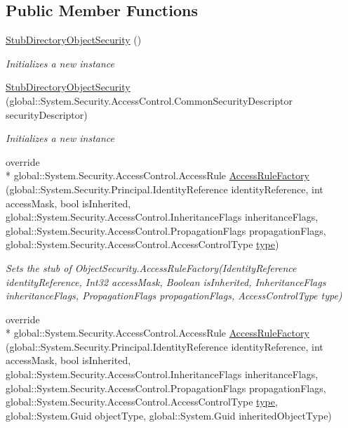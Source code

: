 \subsection*{Public Member Functions}
\begin{DoxyCompactItemize}
\item 
\hyperlink{class_system_1_1_security_1_1_access_control_1_1_fakes_1_1_stub_directory_object_security_ae020b64447dead50dcbdb99722ff2e1b}{Stub\-Directory\-Object\-Security} ()
\begin{DoxyCompactList}\small\item\em Initializes a new instance\end{DoxyCompactList}\item 
\hyperlink{class_system_1_1_security_1_1_access_control_1_1_fakes_1_1_stub_directory_object_security_a02e77e1d058c7b675a35b9373ad95db3}{Stub\-Directory\-Object\-Security} (global\-::\-System.\-Security.\-Access\-Control.\-Common\-Security\-Descriptor security\-Descriptor)
\begin{DoxyCompactList}\small\item\em Initializes a new instance\end{DoxyCompactList}\item 
override \\*
global\-::\-System.\-Security.\-Access\-Control.\-Access\-Rule \hyperlink{class_system_1_1_security_1_1_access_control_1_1_fakes_1_1_stub_directory_object_security_aeba7dc4f1c2937d47a41c2f3c3a7d830}{Access\-Rule\-Factory} (global\-::\-System.\-Security.\-Principal.\-Identity\-Reference identity\-Reference, int access\-Mask, bool is\-Inherited, global\-::\-System.\-Security.\-Access\-Control.\-Inheritance\-Flags inheritance\-Flags, global\-::\-System.\-Security.\-Access\-Control.\-Propagation\-Flags propagation\-Flags, global\-::\-System.\-Security.\-Access\-Control.\-Access\-Control\-Type \hyperlink{jquery-1_810_82-vsdoc_8js_a3940565e83a9bfd10d95ffd27536da91}{type})
\begin{DoxyCompactList}\small\item\em Sets the stub of Object\-Security.\-Access\-Rule\-Factory(\-Identity\-Reference identity\-Reference, Int32 access\-Mask, Boolean is\-Inherited, Inheritance\-Flags inheritance\-Flags, Propagation\-Flags propagation\-Flags, Access\-Control\-Type type)\end{DoxyCompactList}\item 
override \\*
global\-::\-System.\-Security.\-Access\-Control.\-Access\-Rule \hyperlink{class_system_1_1_security_1_1_access_control_1_1_fakes_1_1_stub_directory_object_security_a3c09b41601e82a7fc79f54de985d4ffb}{Access\-Rule\-Factory} (global\-::\-System.\-Security.\-Principal.\-Identity\-Reference identity\-Reference, int access\-Mask, bool is\-Inherited, global\-::\-System.\-Security.\-Access\-Control.\-Inheritance\-Flags inheritance\-Flags, global\-::\-System.\-Security.\-Access\-Control.\-Propagation\-Flags propagation\-Flags, global\-::\-System.\-Security.\-Access\-Control.\-Access\-Control\-Type \hyperlink{jquery-1_810_82-vsdoc_8js_a3940565e83a9bfd10d95ffd27536da91}{type}, global\-::\-System.\-Guid object\-Type, global\-::\-System.\-Guid inherited\-Object\-Type)

\end{DoxyCompactItemize}
